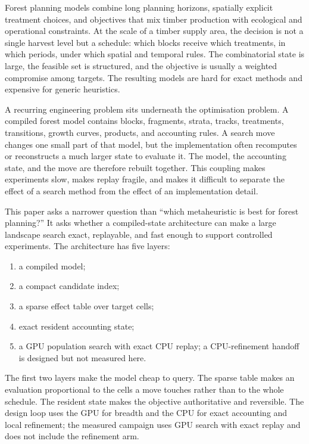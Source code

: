\documentclass[preprint,11pt]{elsarticle}
\providecommand{\tightlist}{\setlength{\itemsep}{0pt}\setlength{\parskip}{0pt}}
\begin{document}
Forest planning models combine long planning horizons, spatially explicit treatment choices, and objectives that mix timber production with ecological and operational constraints. At the scale of a timber supply area, the decision is not a single harvest level but a schedule: which blocks receive which treatments, in which periods, under which spatial and temporal rules. The combinatorial state is large, the feasible set is structured, and the objective is usually a weighted compromise among targets. The resulting models are hard for exact methods and expensive for generic heuristics.

A recurring engineering problem sits underneath the optimisation problem. A compiled forest model contains blocks, fragments, strata, tracks, treatments, transitions, growth curves, products, and accounting rules. A search move changes one small part of that model, but the implementation often recomputes or reconstructs a much larger state to evaluate it. The model, the accounting state, and the move are therefore rebuilt together. This coupling makes experiments slow, makes replay fragile, and makes it difficult to separate the effect of a search method from the effect of an implementation detail.

This paper asks a narrower question than ``which metaheuristic is best for forest planning?'' It asks whether a compiled-state architecture can make a large landscape search exact, replayable, and fast enough to support controlled experiments. The architecture has five layers:

\begin{enumerate}
\def\labelenumi{\arabic{enumi}.}
\tightlist
\item
  a compiled model;
\item
  a compact candidate index;
\item
  a sparse effect table over target cells;
\item
  exact resident accounting state;
\item
  a GPU population search with exact CPU replay; a CPU-refinement handoff is designed but not measured here.
\end{enumerate}

The first two layers make the model cheap to query. The sparse table makes an evaluation proportional to the cells a move touches rather than to the whole schedule. The resident state makes the objective authoritative and reversible. The design loop uses the GPU for breadth and the CPU for exact accounting and local refinement; the measured campaign uses GPU search with exact replay and does not include the refinement arm.
\end{document}
